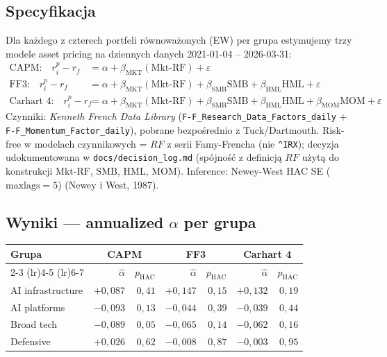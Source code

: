 \documentclass[11pt,a4paper]{article}
\begin{document}
\subsection{Specyfikacja}
Dla każdego z czterech portfeli równoważonych (EW) per grupa estymujemy trzy
modele asset pricing na dziennych danych 2021-01-04 -- 2026-03-31:
\begin{align*}
\text{CAPM:}\quad r_i^p - r_f &= \alpha + \beta_{\text{MKT}}(\text{Mkt-RF}) + \varepsilon \\
\text{FF3:}\quad   r_i^p - r_f &= \alpha + \beta_{\text{MKT}}(\text{Mkt-RF}) + \beta_{\text{SMB}}\text{SMB} + \beta_{\text{HML}}\text{HML} + \varepsilon \\
\text{Carhart 4:}\quad r_i^p - r_f &= \alpha + \beta_{\text{MKT}}(\text{Mkt-RF}) + \beta_{\text{SMB}}\text{SMB} + \beta_{\text{HML}}\text{HML} + \beta_{\text{MOM}}\text{MOM} + \varepsilon
\end{align*}
Czynniki: \emph{Kenneth French Data Library} (\texttt{F-F\_Research\_Data\_Factors\_daily}
+ \texttt{F-F\_Momentum\_Factor\_daily}), pobrane bezpośrednio z Tuck/Dartmouth.
Risk-free w modelach czynnikowych = $RF$ z serii Famy-Frencha (nie \texttt{\^{}IRX});
decyzja udokumentowana w \texttt{docs/decision\_log.md} (spójność z definicją
$RF$ użytą do konstrukcji $\text{Mkt-RF}$, $\text{SMB}$, $\text{HML}$, $\text{MOM}$).
Inference: Newey-West HAC SE ($\text{maxlags}=5$) (Newey i West, 1987).

\subsection{Wyniki --- annualized $\alpha$ per grupa}
\begin{center}\small
\begin{tabular}{lrrrrrr}
\toprule
Grupa & \multicolumn{2}{c}{CAPM} & \multicolumn{2}{c}{FF3} & \multicolumn{2}{c}{Carhart 4} \\
\cmidrule(lr){2-3} \cmidrule(lr){4-5} \cmidrule(lr){6-7}
      & $\hat\alpha$ & $p_{\text{HAC}}$ & $\hat\alpha$ & $p_{\text{HAC}}$ & $\hat\alpha$ & $p_{\text{HAC}}$ \\
\midrule
AI infrastructure & $+0{,}087$ & $0{,}41$ & $+0{,}147$ & $0{,}15$ & $+0{,}132$ & $0{,}19$ \\
AI platforms      & $-0{,}093$ & $0{,}13$ & $-0{,}044$ & $0{,}39$ & $-0{,}039$ & $0{,}44$ \\
Broad tech        & $-0{,}089$ & $0{,}05$ & $-0{,}065$ & $0{,}14$ & $-0{,}062$ & $0{,}16$ \\
Defensive         & $+0{,}026$ & $0{,}62$ & $-0{,}008$ & $0{,}87$ & $-0{,}003$ & $0{,}95$ \\
\bottomrule
\end{tabular}
\end{center}
\end{document}

